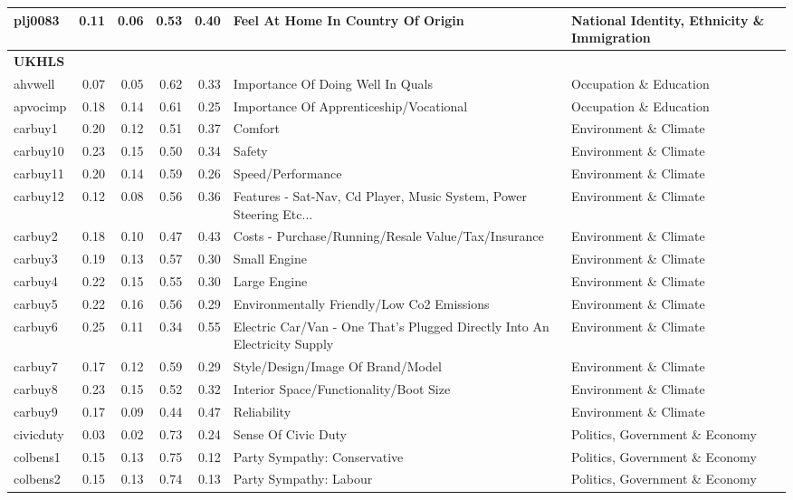 \begin{longtable}{l|rrrrll}
plj0083 & 0.11 & 0.06 & 0.53 & 0.40 & Feel At Home In Country Of Origin & National Identity, Ethnicity \& Immigration \\ 
\midrule
\multicolumn{7}{l}{\textbf{UKHLS}} \\ 
\midrule
ahvwell & 0.07 & 0.05 & 0.62 & 0.33 & Importance Of Doing Well In Quals & Occupation \& Education \\ 
apvocimp & 0.18 & 0.14 & 0.61 & 0.25 & Importance Of Apprenticeship/Vocational & Occupation \& Education \\ 
carbuy1 & 0.20 & 0.12 & 0.51 & 0.37 & Comfort & Environment \& Climate \\ 
carbuy10 & 0.23 & 0.15 & 0.50 & 0.34 & Safety & Environment \& Climate \\ 
carbuy11 & 0.20 & 0.14 & 0.59 & 0.26 & Speed/Performance & Environment \& Climate \\ 
carbuy12 & 0.12 & 0.08 & 0.56 & 0.36 & Features - Sat-Nav, Cd Player, Music System, Power Steering Etc... & Environment \& Climate \\ 
carbuy2 & 0.18 & 0.10 & 0.47 & 0.43 & Costs - Purchase/Running/Resale Value/Tax/Insurance & Environment \& Climate \\ 
carbuy3 & 0.19 & 0.13 & 0.57 & 0.30 & Small Engine & Environment \& Climate \\ 
carbuy4 & 0.22 & 0.15 & 0.55 & 0.30 & Large Engine & Environment \& Climate \\ 
carbuy5 & 0.22 & 0.16 & 0.56 & 0.29 & Environmentally Friendly/Low Co2 Emissions & Environment \& Climate \\ 
carbuy6 & 0.25 & 0.11 & 0.34 & 0.55 & Electric Car/Van - One That's Plugged Directly Into An Electricity Supply & Environment \& Climate \\ 
carbuy7 & 0.17 & 0.12 & 0.59 & 0.29 & Style/Design/Image Of Brand/Model & Environment \& Climate \\ 
carbuy8 & 0.23 & 0.15 & 0.52 & 0.32 & Interior Space/Functionality/Boot Size & Environment \& Climate \\ 
carbuy9 & 0.17 & 0.09 & 0.44 & 0.47 & Reliability & Environment \& Climate \\ 
civicduty & 0.03 & 0.02 & 0.73 & 0.24 & Sense Of Civic Duty & Politics, Government \& Economy \\ 
colbens1 & 0.15 & 0.13 & 0.75 & 0.12 & Party Sympathy: Conservative & Politics, Government \& Economy \\ 
colbens2 & 0.15 & 0.13 & 0.74 & 0.13 & Party Sympathy: Labour & Politics, Government \& Economy \\ 

\end{longtable}
